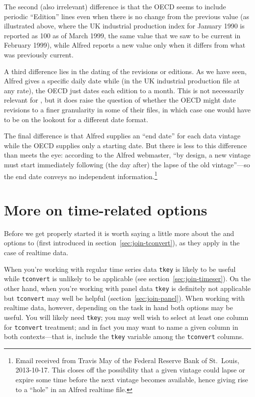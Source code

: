 The second (also irrelevant) difference is that the OECD seems to
include periodic ``Edition'' lines even when there is no change from
the previous value (as illustrated above, where the UK industrial
production index for January 1990 is reported as 100 as of March
1999, the same value that we saw to be current in February 1999),
while Alfred reports a new value only when it differs from what was
previously current.

A third difference lies in the dating of the revisions or editions.
As we have seen, Alfred gives a specific daily date while (in the UK
industrial production file at any rate), the OECD just dates each
edition to a month. This is not necessarily relevant for
, but it does raise the question of whether the OECD
might date revisions to a finer granularity in some of their files, in
which case one would have to be on the lookout for a different date
format.

The final difference is that Alfred supplies an ``end date'' for each
data vintage while the OECD supplies only a starting date. But there
is less to this difference than meets the eye: according to the Alfred
webmaster, ``by design, a new vintage must start immediately following
(the day after) the lapse of the old vintage''---so the end date
conveys no independent information.\footnote{Email received from
  Travis May of the Federal Reserve Bank of St.\ Louis, 2013-10-17.
  This closes off the possibility that a given vintage could lapse or
  expire some time before the next vintage becomes available, hence
  giving rise to a ``hole'' in an Alfred realtime file.}

\section{More on time-related options}
\label{sec:realtime-tconvert}

Before we get properly started it is worth saying a little more about
the  and  options to 
(first introduced in section~\ref{sec:join-tconvert}), as they apply in
the case of realtime data.

When you're working with regular time series data \texttt{tkey} is
likely to be useful while \texttt{tconvert} is unlikely to be
applicable (see section~\ref{sec:join-timeser}). On the other hand,
when you're working with panel data \texttt{tkey} is definitely not
applicable but \texttt{tconvert} may well be helpful
(section~\ref{sec:join-panel}). When working with realtime data,
however, depending on the task in hand both options may be useful. You
will likely need \texttt{tkey}; you may well wish to select at least
one column for \texttt{tconvert} treatment; and in fact you may want
to name a given column in both contexts---that is, include the
\texttt{tkey} variable among the \texttt{tconvert} columns.

